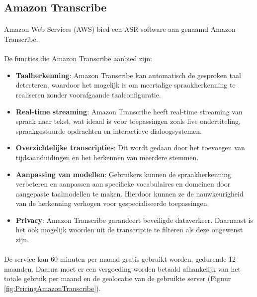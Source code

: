 \subsection{Amazon Transcribe}%

\paragraph{}
Amazon Web Services (AWS) bied een ASR software aan genaamd Amazon Transcribe.

\paragraph{}
De functies die Amazon Transcribe aanbied zijn:

\begin{itemize}
    \item \textbf{Taalherkenning}: Amazon Transcribe kan automatisch de gesproken taal detecteren, waardoor het mogelijk is om meertalige spraakherkenning te realiseren zonder voorafgaande taalconfiguratie.

    \item \textbf{Real-time streaming}: Amazon Transcribe heeft real-time streaming van spraak naar tekst, wat ideaal is voor toepassingen zoals live ondertiteling, spraakgestuurde opdrachten en interactieve dialoogsystemen.

    \item \textbf{Overzichtelijke transcripties}: Dit wordt gedaan door het toevoegen van tijdsaanduidingen en het herkennen van meerdere stemmen.

    \item \textbf{Aanpassing van modellen}: Gebruikers kunnen de spraakherkenning verbeteren en aanpassen aan specifieke vocabulaires en domeinen door aangepaste taalmodellen te maken. Hierdoor kunnen ze de nauwkeurigheid van de herkenning verhogen voor gespecialiseerde toepassingen.

    \item \textbf{Privacy}: Amazon Transcribe garandeert beveiligde dataverkeer. Daarnaast is het ook mogelijk woorden uit de transcriptie te filteren als deze ongewenst zijn.
\end{itemize}

\paragraph{}
 De service kan 60 minuten per maand gratis gebruikt worden, gedurende 12 maanden. Daarna moet er een vergoeding worden betaald afhankelijk van het totale gebruik per maand en de geolocatie van de gebruikte server (Figuur \ref{fig:PricingAmazonTranscribe}).

